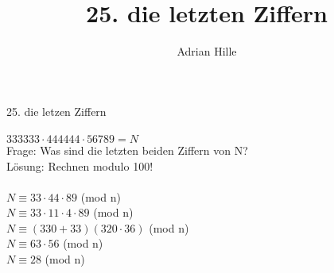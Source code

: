 \documentclass{scrartcl}
\title{25. die letzten Ziffern}
\author{Adrian Hille}
\begin{document}
\Large 25. die letzen Ziffern\\
\\
\normalsize
$333333 \cdot 444444 \cdot 56789 = N$\\
Frage: Was sind die letzten beiden Ziffern von N?\\
L\"osung: Rechnen modulo 100!\\
\\
$N \equiv 33 \cdot 44 \cdot 89$ (mod n)\\
$N \equiv 33 \cdot 11 \cdot 4 \cdot 89$ (mod n)\\
$N \equiv (330+33)(320 \cdot 36)$ (mod n)\\
$N \equiv 63 \cdot 56$ (mod n)\\
$N \equiv 28$ (mod n)\\
\\
\end{document}
